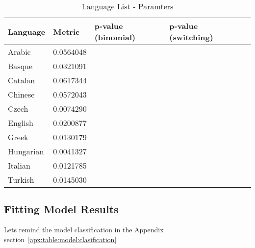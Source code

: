\documentclass[12pt, a4paper]{article}
\begin{document}
\begin{table}[H]
  \centering
  \begin{tabular}{l l l l l}
  Language & Metric & p-value (binomial) & p-value (switching)\\
   \hline
   Arabic & 0.0564048  & & \\
   Basque & 0.0321091  & & \\
   Catalan & 0.0617344 & & \\
   Chinese & 0.0572043 & & \\
   
   Czech & 0.0074290 & & \\
   English & 0.0200877  & & \\
   Greek & 0.0130179  & & \\
   Hungarian & 0.0041327 & & \\
   Italian & 0.0121785 & & \\
   Turkish & 0.0145030  & & \\
     \end{tabular}
 \caption{Language List - Paramters}
 \label{table:1}
\end{table}


\subsection{Fitting Model Results}
Lets remind the model classification in the Appendix section~\ref{apx:table:model:clasification}
\end{document}
